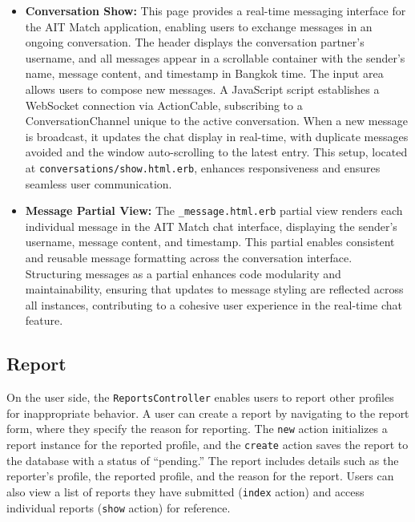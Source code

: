 \begin{enumerate}
\begin{itemize}
        \item \textbf{Conversation Show:} 
        This page provides a real-time messaging interface for the AIT Match application, enabling users to exchange messages in an ongoing conversation. The header displays the conversation partner's username, and all messages appear in a scrollable container with the sender's name, message content, and timestamp in Bangkok time. The input area allows users to compose new messages. A JavaScript script establishes a WebSocket connection via ActionCable, subscribing to a ConversationChannel unique to the active conversation. When a new message is broadcast, it updates the chat display in real-time, with duplicate messages avoided and the window auto-scrolling to the latest entry. This setup, located at \texttt{conversations/show.html.erb}, enhances responsiveness and ensures seamless user communication.

        \item \textbf{Message Partial View:} 
        The \texttt{\_message.html.erb} partial view renders each individual message in the AIT Match chat interface, displaying the sender’s username, message content, and timestamp. This partial enables consistent and reusable message formatting across the conversation interface. Structuring messages as a partial enhances code modularity and maintainability, ensuring that updates to message styling are reflected across all instances, contributing to a cohesive user experience in the real-time chat feature.
        \end{itemize}\bigskip
    \end{enumerate}
    \newpage 
    \subsection{Report}
    On the user side, the \texttt{ReportsController} enables users to report other profiles for inappropriate behavior. A user can create a report by navigating to the report form, where they specify the reason for reporting. The \texttt{new} action initializes a report instance for the reported profile, and the \texttt{create} action saves the report to the database with a status of “pending.” The report includes details such as the reporter’s profile, the reported profile, and the reason for the report. Users can also view a list of reports they have submitted (\texttt{index} action) and access individual reports (\texttt{show} action) for reference.


